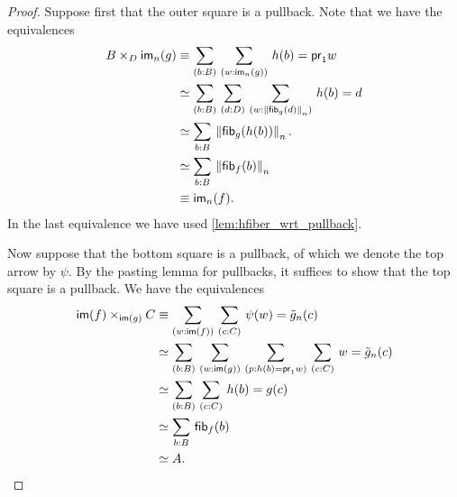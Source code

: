 \begin{proof}
Suppose first that the outer square is a pullback. Note that we have the equivalences
\begin{align*}
B\times_D\im_n(g) & \jdeq \sm{b:B}{w:\im_n(g)} h(b)=\proj1 w\\
& \simeq \sm{b:B}{d:D}{w:\trunc n{\hfib{g}d}} h(b)= d\\
& \simeq \sm{b:B} \trunc n{\hfib{g}{h(b)}}.\\
& \simeq \sm{b:B} \trunc n{\hfib{f}b} \\
& \equiv \im_n(f).
\end{align*}
In the last equivalence we have used \autoref{lem:hfiber_wrt_pullback}.

Now suppose that the bottom square is a pullback, of which we denote the top arrow by $\psi$. By the pasting lemma for pullbacks, it
suffices to show that the top square is a pullback. We have the equivalences
\begin{align*}
\im(f)\times_{\im(g)} C & \jdeq \sm{w:\im(f)}{c:C} \psi(w)=\tilde{g}_n(c)\\
& \simeq \sm{b:B}{w:\im(g)}{p:h(b)=\proj1 w}{c:C} w=\tilde{g}_n(c)\\
& \simeq \sm{b:B}{c:C} h(b)= g(c)\\
& \simeq \sm{b:B}\hfib{f}b\\
& \simeq A.\qedhere
\end{align*}
\end{proof}


